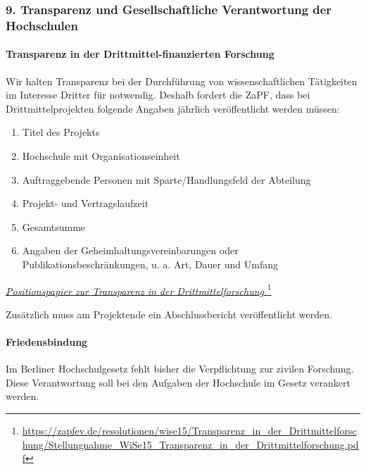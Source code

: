 \documentclass[DIV=calc]{scrartcl}
\begin{document}
\hypertarget{transparenz-und-gesellschaftliche-verantwortung-der-hochschulen}{%
\subsubsection*{9. Transparenz und Gesellschaftliche Verantwortung der Hochschulen}\label{transparenz-und-gesellschaftliche-verantwortung-der-hochschulen}}

\hypertarget{transparenz-in-der-drittmittel-finanzierten-forschung}{%
\paragraph{Transparenz in der Drittmittel-finanzierten Forschung}\label{transparenz-in-der-drittmittel-finanzierten-forschung}}

Wir halten Transparenz bei der Durchführung von wissenschaftlichen Tätigkeiten im Interesse Dritter für notwendig. Deshalb fordert die ZaPF, dass bei Drittmittelprojekten folgende Angaben jährlich veröffentlicht werden müssen:
\begin{enumerate}
\def\labelenumi{\arabic{enumi})}
\item Titel des Projekts
\item Hochschule mit Organisationseinheit
\item Auftraggebende Personen mit Sparte/Handlungsfeld der Abteilung
\item Projekt- und Vertragslaufzeit
\item Gesamtsumme
\item Angaben der Geheimhaltungsvereinbarungen oder Publikationsbeschränkungen, u. a. Art, Dauer und Umfang
\end{enumerate}

\href{https://zapfev.de/resolutionen/wise15/Transparenz_in_der_Drittmittelforschung/Stellungnahme_WiSe15_Transparenz_in_der_Drittmittelforschung.pdf}{\emph{Positionspapier zur Transparenz in der Drittmittelforschung%
  }}\footnote{\url{https://zapfev.de/resolutionen/wise15/Transparenz_in_der_Drittmittelforschung/Stellungnahme_WiSe15_Transparenz_in_der_Drittmittelforschung.pdf}}

Zusätzlich muss am Projektende ein Abschlussbericht veröffentlicht werden.

\hypertarget{friedensbindung}{%
\paragraph{Friedensbindung}\label{friedensbindung}}
Im Berliner Hochschulgesetz fehlt bisher die Verpflichtung zur zivilen Forschung. Diese Verantwortung soll bei den Aufgaben der Hochschule im Gesetz verankert werden.
\end{document}
